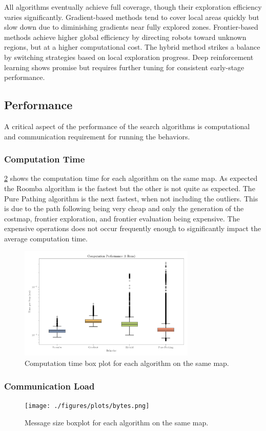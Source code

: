 All algorithms eventually achieve full coverage, though their exploration efficiency varies significantly. 
Gradient-based methods tend to cover local areas quickly but slow down due to diminishing gradients near fully explored zones. 
Frontier-based methods achieve higher global efficiency by directing robots toward unknown regions, but at a higher computational cost. The hybrid method strikes a balance by switching strategies based on local exploration progress. 
Deep reinforcement learning shows promise but requires further tuning for consistent early-stage performance.

\subsection{Performance}
A critical aspect of the performance of the search algorithms is computational and communication requirement for running the behaviors. 
\subsubsection{Computation Time}
\cref{fig:computation-performance} shows the computation time for each algorithm on the same map. As expected the Roomba algorithm is the fastest but the other is not quite as expected.
The Pure Pathing algorithm is the next fastest, when not including the outliers. 
This is due to the path following being very cheap and only the generation of the costmap, frontier exploration, and frontier evaluation being expensive. 
The expensive operations does not occur frequently enough to significantly impact the average computation time.
\begin{figure}[H]
    \begin{center}
        \includegraphics[width=0.75\textwidth]{./figures/plots/computation-performance-(6-runs).png}
    \end{center}
    \caption{Computation time box plot for each algorithm on the same map.}
    \label{fig:computation-performance}
\end{figure}

\subsubsection{Communication {\color{red}Load}}
\begin{figure}[H]
    \begin{center}
        \texttt{[image: ./figures/plots/bytes.png]}
    \end{center}
    \caption{Message size boxplot for each algorithm on the same map.}
    \label{fig:computation-performance}
\end{figure}
